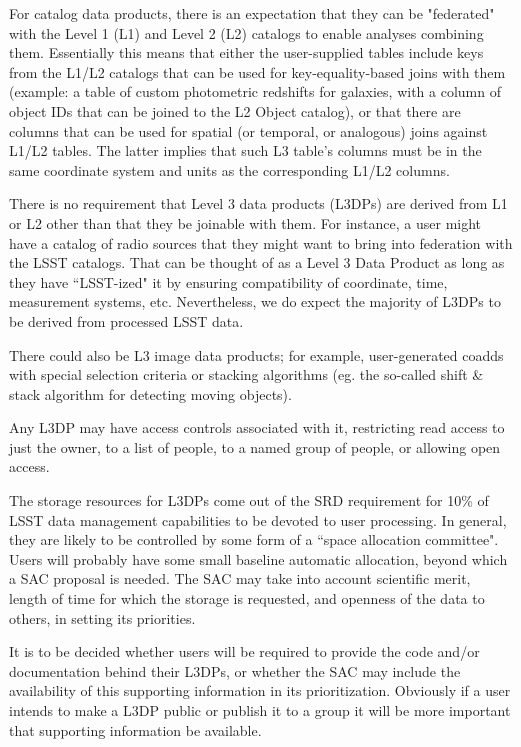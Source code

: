 \documentclass[12pt]{article}
\begin{document}
For catalog data products, there is an expectation that they can be "federated" with the Level 1 (L1) and Level 2 (L2) catalogs to enable analyses combining them.  Essentially this means that either the user-supplied tables include keys from the L1/L2 catalogs that can be used for key-equality-based joins with them (example: a table of custom photometric redshifts for galaxies, with a column of object IDs that can be joined to the L2 Object catalog), or that there are columns that can be used for spatial (or temporal, or analogous) joins against L1/L2 tables. The latter implies that such L3 table's columns must be in the same coordinate system and units as the corresponding L1/L2 columns.

There is no requirement that Level 3 data products (L3DPs) are derived from L1 or L2 other than that they be joinable with them.  For instance, a user might have a catalog of radio sources that they might want to bring into federation with the LSST catalogs. That can be thought of as a Level 3 Data Product as long as they have ``LSST-ized" it by ensuring compatibility of coordinate, time, measurement systems, etc.  Nevertheless, we do expect the majority of L3DPs to be derived from processed LSST data.

There could also be L3 image data products; for example, user-generated coadds with special selection criteria or stacking algorithms (eg. the so-called shift \& stack algorithm for detecting moving objects).

Any L3DP may have access controls associated with it, restricting read access to just the owner, to a list of people, to a named group of people, or allowing open access.

The storage resources for L3DPs come out of the SRD requirement for 10\% of LSST data management capabilities to be devoted to user processing. In general, they are likely to be controlled by some form of a ``space allocation committee".  Users will probably have some small baseline automatic allocation, beyond which a SAC proposal is needed. The SAC may take into account scientific merit, length of time for which the storage is requested, and openness of the data to others, in setting its priorities.

It is to be decided whether users will be required to provide the code and/or documentation behind their L3DPs, or whether the SAC may include the availability of this supporting information in its prioritization.  Obviously if a user intends to make a L3DP public or publish it to a group it will be more important that supporting information be available.
\end{document}
